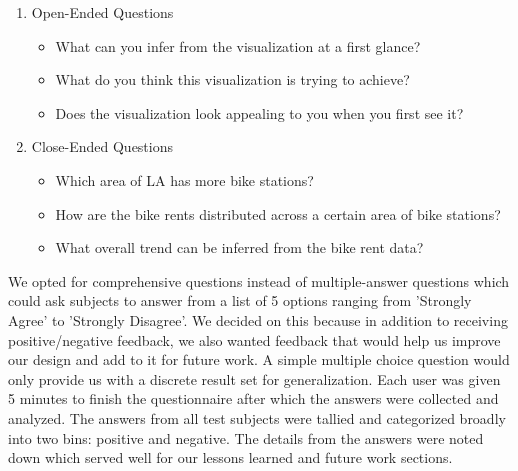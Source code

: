 \begin{enumerate}
	\item Open-Ended Questions
	\begin{itemize}
		\item What can you infer from the visualization at a first glance?
		\item What do you think this visualization is trying to achieve?
		\item Does the visualization look appealing to you when you first see it?
	\end{itemize}
	\item Close-Ended Questions
	\begin{itemize}
		\item Which area of LA has more bike stations?
		\item How are the bike rents distributed across a certain area of bike stations?
		\item What overall trend can be inferred from the bike rent data?
	\end{itemize}
\end{enumerate}
We opted for comprehensive questions instead of multiple-answer questions which could ask subjects to answer from a list of 5 options ranging from 'Strongly Agree' to 'Strongly Disagree'. We decided on this because in addition to receiving positive/negative feedback, we also wanted feedback that would help us improve our design and add to it for future work. A simple multiple choice question would only provide us with a discrete result set for generalization.\newline
Each user was given 5 minutes to finish the questionnaire after which the answers were collected and analyzed. The answers from all test subjects were tallied and categorized broadly into two bins: positive and negative. The details from the answers were noted down which served well for our lessons learned and future work sections.
